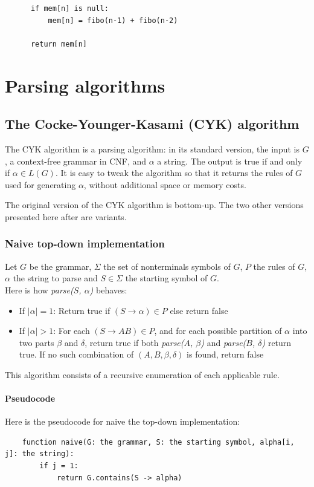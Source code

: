 \documentclass[12pt]{extarticle}
\begin{document}
\begin{multicols}{2}
\begin{lstlisting}
      if mem[n] is null:
          mem[n] = fibo(n-1) + fibo(n-2)
          
      return mem[n]
\end{lstlisting}

\newpage
\section{Parsing algorithms}
\subsection{The Cocke-Younger-Kasami (CYK) algorithm}
The CYK algorithm is a parsing algorithm: in its standard version, the input is
$G$, a context-free
grammar in CNF, and $\alpha$ a string. The output is true if and only if $\alpha\in L(G)$.
It is easy to tweak the algorithm so that it returns the rules of $G$ used for
generating $\alpha$, without additional space or memory costs.

The original version of the CYK algorithm is bottom-up. The two other versions
presented here after are variants.

\subsubsection{Naive top-down implementation}
Let $G$ be the grammar, $\Sigma$ the set of nonterminals symbols of $G$, $P$ the rules of $G$, $\alpha$ the string to parse and $S\in \Sigma$ the starting symbol of $G$.\\
Here is how \textit{parse($S$, $\alpha$)} behaves:
\begin{itemize}
\item If $|\alpha|=1$: Return true if $(S\rightarrow\alpha)\in P$ else return false
\item If $|\alpha|>1$: For each $(S\rightarrow AB)\in P$, and for each possible partition of $\alpha$ into two parts $\beta$ and $\delta$, return true if
both \textit{parse($A$, $\beta$)} and \textit{parse($B$, $\delta$)} return true. If no such combination of $(A,B,\beta,\delta)$ is found, return false
\end{itemize}

This algorithm consists of a recursive enumeration of each applicable rule.

\paragraph{Pseudocode} Here is the pseudocode for naive the top-down implementation:
\begin{lstlisting}
    function naive(G: the grammar, S: the starting symbol, alpha[i, j]: the string):
        if j = 1:
            return G.contains(S -> alpha)


\end{lstlisting}
\end{multicols}
\end{document}
